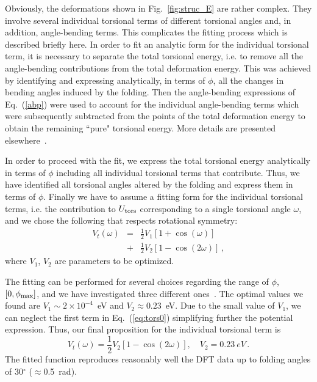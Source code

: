 \documentclass[aps,prb,floatfix,twocolumn,showpacs]{revtex4}
\begin{document}
Obviously, the deformations shown in Fig.~\ref{fig:struc_E} are rather complex. They 
involve several individual torsional terms of different torsional angles and, in addition, 
angle-bending terms. 
This complicates the fitting process which is described briefly here.
In order to fit an analytic form for the individual torsional term, 
it is necessary to separate the total torsional energy, i.e. to 
remove all the angle-bending contributions from the total deformation energy.
This was achieved by identifying and expressing analytically, in terms
of $\phi$, all the changes in bending angles 
induced by the folding. Then the angle-bending expressions of Eq.~(\ref{abp}) were used to
account for the individual angle-bending terms which were subsequently subtracted
from the points of the total deformation energy to obtain the remaining ``pure" torsional energy.
More details are presented elsewhere~\cite{torsional_p}.
 
In order to proceed with the fit, we express the total torsional energy 
analytically in terms of $\phi$ including all individual torsional terms that
contribute. Thus, we have identified all torsional angles altered by the
folding and express them in terms of $\phi$. Finally we have to assume a
fitting form for the individual torsional terms, i.e. the 
contribution to $U_{\rm tors}$ corresponding to a single torsional angle $\omega$, 
 and we chose the following
that respects rotational symmetry\cite{jensen}:
\begin{eqnarray}
V_t(\omega) &=& \frac{1}{2} V_1 \left[ 1 + \cos ( \omega ) \right] \nonumber \\
 &+& \frac{1}{2} V_2 \left[ 1 - \cos (2 \omega ) \right] \label{eq:tors0} \,,
\end{eqnarray}    
where $V_1$, $V_2$ are parameters to be optimized. 

The fitting can be performed for several choices regarding the range of $\phi$, $[0, \phi_{\rm max}]$, 
and we have investigated three different ones~\cite{torsional_p}. 
The optimal values we found are $V_1 \sim 2\times10^{-4}$~eV and $V_2\approx0.23$~eV.
Due to the small value of $V_1$, we can neglect the
first term in Eq.~(\ref{eq:tors0}) simplifying further the potential expression. Thus, our final
proposition for the individual torsional term is
\begin{equation}
\label{eq:tors1}
V_t(\omega) = \frac{1}{2} V_2 \left[ 1 - \cos (2 \omega ) \right], \quad V_2=0.23\:eV\,.
\end{equation}
The fitted function reproduces reasonably well the DFT data up to folding angles of 30$^{\circ}$ 
($\approx$0.5~rad)\cite{torsional_p}.
\end{document}
